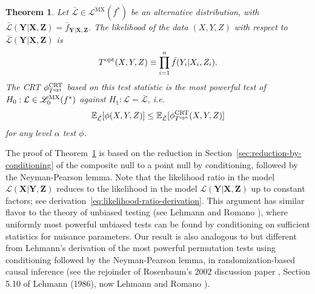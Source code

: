 \documentclass[12pt]{article}
\newtheorem{theorem}{Theorem}
\theoremstyle{definition}
\theoremstyle{remark}
\newcommand{\prx}{\bm X}
\newcommand{\srx}{X}
\newcommand{\prz}{\bm Z}
\newcommand{\srz}{Z}
\newcommand{\pry}{{\bm Y}}
\newcommand{\sry}{Y}
\def\CRT{\textnormal{CRT}}
\begin{document}
\begin{theorem} \label{prop:crt-optimality}
	Let $\bar{\mathcal L} \in \mathscr L^{\text{MX}}(f^*)$ be an alternative distribution, with $\bar{\mathcal L}(\pry|\prx,\prz) = \bar f_{\pry|\prx,\prz}$. The likelihood of the data $(\srx, \sry, \srz)$ with respect to $\bar{\mathcal L}(\pry|\prx,\prz)$ is
	\begin{equation}
	T^{\textnormal{opt}}(\srx, \sry, \srz) \equiv \prod_{i = 1}^n  \bar f(\sry_i|\srx_i, \srz_i).
	\label{log-likelihood-ratio}
	\end{equation}
	The CRT $\phi^{\CRT}_{T^{\textnormal{opt}}}$ based on this test statistic is the most powerful test of $H_0: \mathcal L \in \mathscr L_0^{\textnormal{MX}}(f^*)$ against $H_1: \mathcal L = \bar{\mathcal L}$, i.e. 
	\begin{equation}
	\mathbb E_{\bar{\mathcal L}}[\phi(\srx,\sry,\srz)] \leq \mathbb E_{\bar{\mathcal L}}[\phi^{\CRT}_{T^\textnormal{opt}}(\srx, \sry, \srz)]
	\label{unconditional}
	\end{equation}
	for any level $\alpha$ test $\phi$.
\end{theorem}

The proof of Theorem~\ref{prop:crt-optimality} is based on the reduction in Section~\ref{sec:reduction-by-conditioning} of the composite null to a point null by conditioning, followed by the Neyman-Pearson lemma. Note that the likelihood ratio in the model $\mathcal L(\prx|\pry, \prz)$ reduces to the likelihood in the model $\mathcal L(\pry|\prx, \prz)$ up to constant factors; see derivation~\eqref{eq:likelihood-ratio-derivation}. This argument has similar flavor to the theory of unbiased testing (see Lehmann and Romano \cite[Chapter 4]{TSH}), where uniformly most powerful unbiased tests can be found by conditioning on sufficient statistics for nuisance parameters. Our result is also analogous to but different from Lehmann's derivation of the most powerful permutation tests using conditioning followed by the Neyman-Pearson lemma, in randomization-based causal inference (see the rejoinder of Rosenbaum's 2002 discussion paper \cite{Rosenbaum2002}, Section 5.10 of Lehmann (1986), now Lehmann and Romano \cite[Section 5.9]{TSH}).
\end{document}

